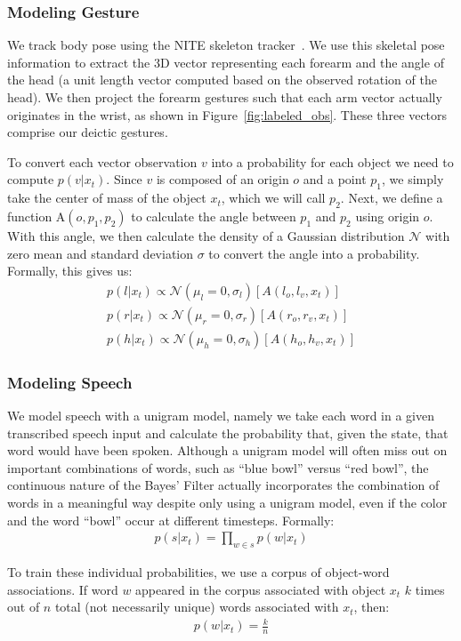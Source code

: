 \documentclass[a4paper, 11pt]{article} %
\begin{document}
\subsubsection{Modeling Gesture}
We track body pose using the NITE skeleton tracker~\citep{openni}. We use this skeletal pose information to extract the 3D vector representing each forearm and the angle of the head (a unit length vector computed based on the observed rotation of the head). We then project the forearm gestures such that each arm vector actually originates in the wrist, as shown in Figure~\ref{fig:labeled_obs}. These three vectors comprise our deictic gestures.

To convert each vector observation $v$ into a probability for each object we need to compute $p(v | x_t)$. Since $v$ is composed of an origin $o$ and a point $p_1$, we simply take the center of mass of the object $x_t$, which we will call $p_2$. Next, we define a function $\mbox{A}(o, p_1, p_2)$ to calculate the angle between $p_1$ and $p_2$ using origin $o$. With this angle, we then calculate the density of a Gaussian  distribution $\mathcal{N}$ with zero mean and standard deviation $\sigma$ to convert the angle into a probability. Formally, this gives us:
\begin{align}
p(l | x_t) \propto \mathcal{N}(\mu_l=0, \sigma_l)[A(l_o, l_v, x_t)]\\
p(r | x_t) \propto \mathcal{N}(\mu_r=0, \sigma_r)[A(r_o, r_v, x_t)]\\
p(h | x_t) \propto \mathcal{N}(\mu_h=0, \sigma_h)[A(h_o, h_v, x_t)]
\end{align}
\subsubsection{Modeling Speech}
We model speech with a unigram model, namely we take each word in a given transcribed speech input and calculate the probability that, given the state, that word would have been spoken. Although a unigram model will often miss out on important combinations of words, such as ``blue bowl'' versus ``red bowl'', the continuous nature of the Bayes' Filter actually incorporates the combination of words in a meaningful way despite only using a unigram model, even if the color and the word ``bowl'' occur at different timesteps. Formally:
\begin{align}
p(s |x_t) = \displaystyle \prod_{w \in s} p(w | x_t)
\end{align}

To train these individual probabilities, we use a corpus of object-word associations. If word $w$ appeared in the corpus associated with object $x_t$ $k$ times out of $n$ total (not necessarily unique) words associated with $x_t$, then:
\begin{align}
p(w | x_t) = \frac{k}{n}
\end{align}
\end{document}
